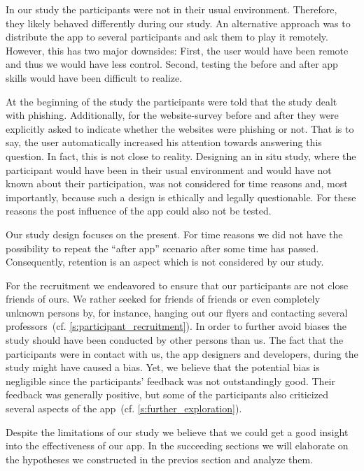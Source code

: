 \begin{description}[leftmargin=0cm]
	\item[Behavior Change] In our study the participants were not in their usual environment. 
	Therefore, they likely behaved differently during our study.
	An alternative approach was to distribute the app to several participants and ask them to play it remotely.
	However, this has two major downsides: First, the user would have been remote and thus we would have less control.
	Second, testing the before and after app skills would have been difficult to realize.
	\item[Increased Attention] At the beginning of the study the participants were told that the study dealt with phishing.
	Additionally, for the website-survey before and after they were explicitly asked to indicate whether the websites were phishing or not.
	That is to say, the user automatically increased his attention towards answering this question.
	In fact, this is not close to reality.
	Designing an in situ study, where the participant would have been in their usual environment and would have not known about their participation, was not considered for time reasons and, most importantly, because such a design is ethically and legally questionable. 
	For these reasons the post influence of the app could also not be tested.
	\item[Retention] Our study design focuses on the present.
	For time reasons we did not have the possibility to repeat the ``after app'' scenario after some time has passed.
	Consequently, retention is an aspect which is not considered by our study.
	\item[Bias] For the recruitment we endeavored to ensure that our participants are not close friends of ours. 
	We rather seeked for friends of friends or even completely unknown persons by, for instance, hanging out our flyers and contacting several professors~(cf. \autoref{s:participant_recruitment}).
	In order to further avoid biases the study should have been conducted by other persons than us.
	The fact that the participants were in contact with us, the app designers and developers, during the study might have caused a bias.
	Yet, we believe that the potential bias is negligible since the participants' feedback was not outstandingly good.
	Their feedback was generally positive, but some of the participants also criticized several aspects of the app~(cf. \autoref{s:further_exploration}).
\end{description}

Despite the limitations of our study we believe that we could get a good insight into the effectiveness of our app.
In the succeeding sections we will elaborate on the hypotheses we constructed in the previos section and analyze them.
